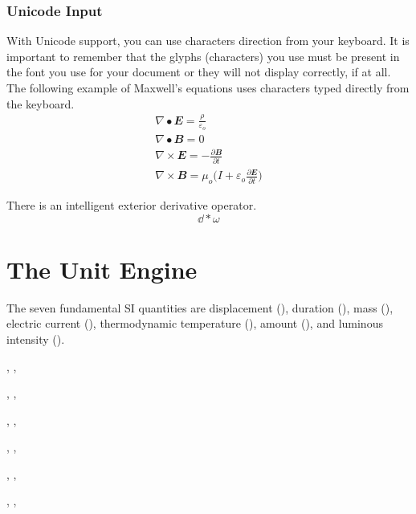 \documentclass{article}
\begin{document}
\subsubsection{Unicode Input}
With Unicode support, you can use characters direction from your keyboard. It is important to
remember that the glyphs (characters) you use must be present in the font you use for your
document or they will not display correctly, if at all. The following example of Maxwell's 
equations uses characters typed directly from the keyboard. 
\begin{gather*}
  ∇∙𝑬=\frac{𝜌}{𝜀_o} \\
    ∇∙𝑩=0 \\
    ∇×𝑬=−\frac{∂𝑩}{∂𝑡} \\
    ∇×𝑩=𝜇_o \biggl(I + 𝜀_o \frac{∂𝑬}{∂𝑡}\biggr)
\end{gather*}

There is an intelligent exterior derivative operator. 
\[
  \dd*\omega
\]
\restoregeometry

\section{The Unit Engine}
The seven fundamental SI quantities are displacement (), duration (),
mass (), electric current (), thermodynamic temperature (), 
amount (), and luminous intensity (). 


,
,

,
,

,
,

\begin{usebaseunit}
  , , 
\end{usebaseunit}

\begin{usederivedunit}
  , , 
\end{usederivedunit}

\begin{usealternativeunit}
  , , 
\end{usealternativeunit}
\end{document}
